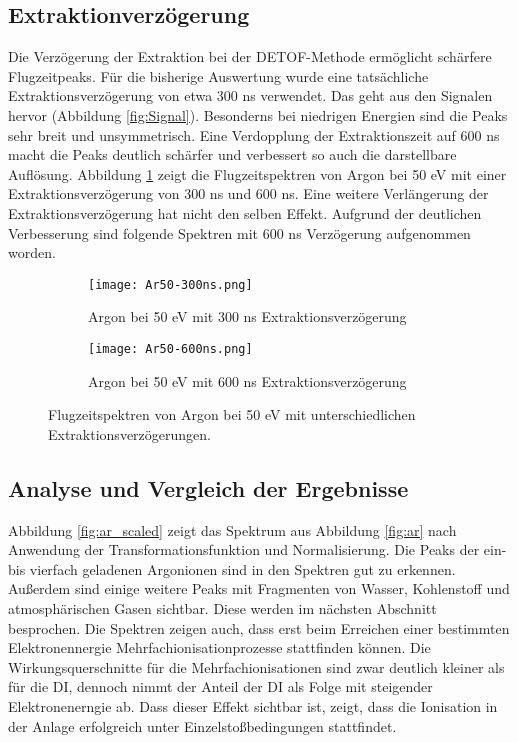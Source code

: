 \subsection{Extraktionverzögerung}
Die Verzögerung der Extraktion bei der DETOF-Methode ermöglicht schärfere Flugzeitpeaks. Für die bisherige Auswertung wurde eine tatsächliche Extraktionsverzögerung von etwa 300 ns verwendet. Das geht aus den Signalen hervor (Abbildung \ref{fig:Signal}). Besonderns bei niedrigen Energien sind die Peaks sehr breit und unsymmetrisch. Eine Verdopplung der Extraktionszeit auf 600 ns macht die Peaks deutlich schärfer und verbessert so auch die darstellbare Auflösung. Abbildung \ref{fig:delay} zeigt die Flugzeitspektren von Argon bei 50 eV mit einer Extraktionsverzögerung von 300 ns und 600 ns. Eine weitere Verlängerung der Extraktionsverzögerung hat nicht den selben Effekt. Aufgrund der deutlichen Verbesserung sind folgende Spektren mit 600 ns Verzögerung aufgenommen worden.
\begin{figure}
    \centering
    \begin{subfigure}{.45\textwidth}
        \centering
        \texttt{[image: Ar50-300ns.png]}
        \caption{Argon bei 50 eV mit 300 ns Extraktionsverzögerung}
    \end{subfigure}%
    \hfill
    \begin{subfigure}{.45\textwidth}
        \centering
        \texttt{[image: Ar50-600ns.png]}
        \caption{Argon bei 50 eV mit 600 ns Extraktionsverzögerung}
        
    \end{subfigure}
    \caption[Einfluß der Extraktionsverzögerung auf Flugzeitspektren]{Flugzeitspektren von Argon bei 50 eV mit unterschiedlichen Extraktionsverzögerungen.}
    \label{fig:delay}
\end{figure}

\subsection{Analyse und Vergleich der Ergebnisse}
Abbildung \ref{fig:ar_scaled} zeigt das Spektrum aus Abbildung \ref{fig:ar} nach Anwendung der Transformationsfunktion und Normalisierung. Die Peaks der ein- bis vierfach geladenen Argonionen sind in den Spektren gut zu erkennen. Außerdem sind einige weitere Peaks mit Fragmenten von Wasser, Kohlenstoff und atmosphärischen Gasen sichtbar. Diese werden im nächsten Abschnitt besprochen. Die Spektren zeigen auch, dass erst beim Erreichen einer bestimmten Elektronennergie Mehrfachionisationprozesse stattfinden können. Die Wirkungsquerschnitte für die Mehrfachionisationen sind zwar deutlich kleiner als für die DI, dennoch nimmt der Anteil der DI als Folge mit steigender Elektronenerngie ab. Dass dieser Effekt sichtbar ist, zeigt, dass die Ionisation in der Anlage erfolgreich unter Einzelstoßbedingungen stattfindet. 


